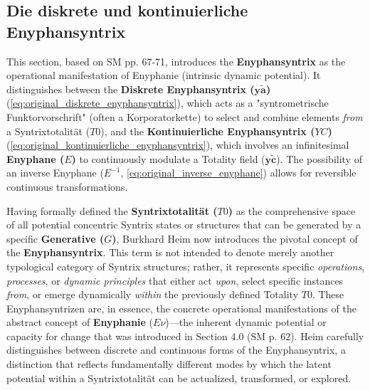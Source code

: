 \documentclass[12pt]{article}
\newcommand{\syntrixtotalitaet}{T0}
\newcommand{\generative}{G}
\newcommand{\diskreteEnyphansyntrix}{\bm{y\widetilde{a}}}
\newcommand{\kontinuierlicheEnyphansyntrix}{YC}
\newcommand{\enyphane}{E}
\begin{document}
\subsection{Die diskrete und kontinuierliche Enyphansyntrix}
\label{sec:enyphansyntrix_types}

This section, based on SM pp. 67-71, introduces the \textbf{Enyphansyntrix} as the operational manifestation of Enyphanie (intrinsic dynamic potential). It distinguishes between the \textbf{Diskrete Enyphansyntrix (\(\diskreteEnyphansyntrix\))} (\eqref{eq:original_diskrete_enyphansyntrix}), which acts as a "syntrometrische Funktorvorschrift" (often a Korporatorkette) to select and combine elements \textit{from} a Syntrixtotalität (\(\syntrixtotalitaet\)), and the \textbf{Kontinuierliche Enyphansyntrix (\(\kontinuierlicheEnyphansyntrix\))} (\eqref{eq:original_kontinuierliche_enyphansyntrix}), which involves an infinitesimal \textbf{Enyphane (\(\enyphane\))} to continuously modulate a Totality field (\(\mathbf{y\widetilde{c}}\)). The possibility of an inverse Enyphane (\(\enyphane^{-1}\), \eqref{eq:original_inverse_enyphane}) allows for reversible continuous transformations.

Having formally defined the \textbf{Syntrixtotalität (\( \syntrixtotalitaet \))} as the comprehensive space of all potential concentric Syntrix states or structures that can be generated by a specific \textbf{Generative (\( \generative \))}, Burkhard Heim now introduces the pivotal concept of the \textbf{Enyphansyntrix}. This term is not intended to denote merely another typological category of Syntrix structures; rather, it represents specific \textit{operations}, \textit{processes}, or \textit{dynamic principles} that either act \textit{upon}, select specific instances \textit{from}, or emerge dynamically \textit{within} the previously defined Totality \( \syntrixtotalitaet \). These Enyphansyntrizen are, in essence, the concrete operational manifestations of the abstract concept of \textbf{Enyphanie} (\(E\nu\))—the inherent dynamic potential or capacity for change that was introduced in Section 4.0 (SM p. 62). Heim carefully distinguishes between discrete and continuous forms of the Enyphansyntrix, a distinction that reflects fundamentally different modes by which the latent potential within a Syntrixtotalität can be actualized, transformed, or explored.
\end{document}
